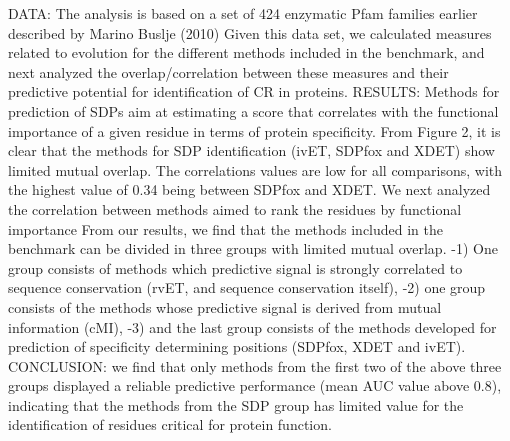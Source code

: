 DATA: The analysis is based on a set of 424 enzymatic Pfam families earlier described by Marino Buslje (2010)  \cite{teppa2012disentangling}
Given this data set, we calculated measures related to evolution for the different methods included in the benchmark, and next analyzed the overlap/correlation between these measures and their predictive potential for identification of CR in proteins. \cite{teppa2012disentangling}
RESULTS:
	Methods for prediction of SDPs aim at estimating a score that correlates with the functional importance of a given residue in terms of protein specificity. \cite{teppa2012disentangling}
	From Figure 2, it is clear that the methods for SDP identification (ivET, SDPfox and XDET) show limited mutual overlap. The correlations values are low for all comparisons, with the highest value of 0.34 being between SDPfox and XDET. \cite{teppa2012disentangling}
	 We next analyzed the correlation between methods aimed to rank the residues by functional importance \cite{teppa2012disentangling}
	From our results, we find that the methods included in the benchmark can be divided in three groups with limited mutual overlap.  \cite{teppa2012disentangling}
		-1) One group consists of methods which predictive signal is strongly correlated to sequence conservation (rvET, and sequence conservation itself),  \cite{teppa2012disentangling}
		-2) one group consists of the methods whose predictive signal is derived from mutual information (cMI),  \cite{teppa2012disentangling}
		-3) and the last group consists of the methods developed for prediction of specificity determining positions (SDPfox, XDET and ivET). \cite{teppa2012disentangling}
	CONCLUSION:  we find that only methods from the first two of the above three groups displayed a reliable predictive performance (mean AUC value above 0.8), indicating that the methods from the SDP group has limited value for the identification of residues critical for protein function. \cite{teppa2012disentangling}

